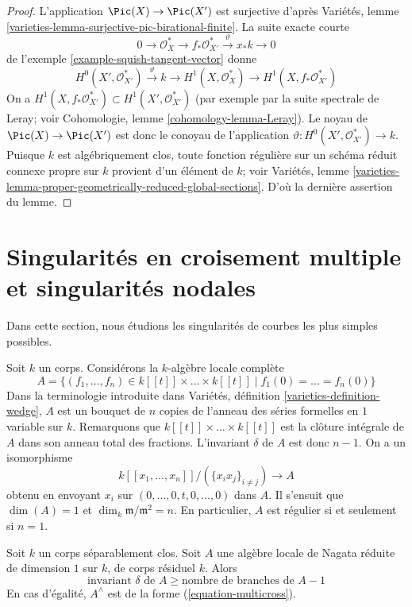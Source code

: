 \begin{proof}
L'application $\Pic(X) \to \Pic(X')$ est surjective d'après Variétés, lemme \ref{varieties-lemma-surjective-pic-birational-finite}. La suite exacte courte $$
0 \to \mathcal{O}_X^* \to f_*\mathcal{O}_{X'}^*
\xrightarrow{\vartheta} x_*k \to 0
$$ de l'exemple \ref{example-squish-tangent-vector} donne $$
H^0(X', \mathcal{O}_{X'}^*) \xrightarrow{\vartheta} k \to
H^1(X, \mathcal{O}_X^*) \to H^1(X, f_*\mathcal{O}_{X'}^*)
$$ On a $H^1(X, f_*\mathcal{O}_{X'}^*) \subset H^1(X', \mathcal{O}_{X'}^*)$ (par exemple par la suite spectrale de Leray; voir Cohomologie, lemme \ref{cohomology-lemma-Leray}). Le noyau de $\Pic(X) \to \Pic(X')$ est donc le conoyau de l'application $\vartheta : H^0(X', \mathcal{O}_{X'}^*) \to k$. Puisque $k$ est algébriquement clos, toute fonction régulière sur un schéma réduit connexe propre sur $k$ provient d'un élément de $k$; voir Variétés, lemme \ref{varieties-lemma-proper-geometrically-reduced-global-sections}. D'où la dernière assertion du lemme.
\end{proof}


\section{Singularités en croisement multiple et singularités nodales}
\label{section-multicross}

\noindent
Dans cette section, nous étudions les singularités de courbes les plus simples possibles.

\medskip\noindent
Soit $k$ un corps. Considérons la $k$-algèbre locale complète \begin{equation}
\label{equation-multicross}
A = \{(f_1, \ldots, f_n) \in k[[t]] \times \ldots \times k[[t]] \mid
f_1(0) = \ldots = f_n(0)\}
\end{equation} Dans la terminologie introduite dans Variétés, définition \ref{varieties-definition-wedge}, $A$ est un bouquet de $n$ copies de l'anneau des séries formelles en $1$ variable sur $k$. Remarquons que $k[[t]] \times \ldots \times k[[t]]$ est la clôture intégrale de $A$ dans son anneau total des fractions. L'invariant $\delta$ de $A$ est donc $n - 1$. On a un isomorphisme $$
k[[x_1, \ldots, x_n]]/(\{x_ix_j\}_{i \not = j}) \longrightarrow A
$$ obtenu en envoyant $x_i$ sur $(0, \ldots, 0, t, 0, \ldots, 0)$ dans $A$. Il s'ensuit que $\dim(A) = 1$ et $\dim_k \mathfrak m/\mathfrak m^2 = n$. En particulier, $A$ est régulier si et seulement si $n = 1$.

\begin{lemma}
\label{lemma-multicross-algebra}
Soit $k$ un corps séparablement clos. Soit $A$ une algèbre locale de Nagata réduite de dimension $1$ sur $k$, de corps résiduel $k$. Alors $$
\text{invariant }\delta\text{ de }A \geq \text{nombre de branches de }A - 1
$$ En cas d'égalité, $A^\wedge$ est de la forme (\ref{equation-multicross}).
\end{lemma}

